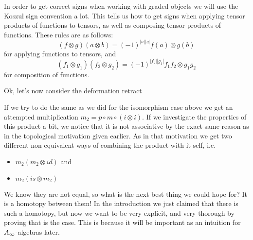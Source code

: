In order to get correct signs when working with graded objects we will use the Koszul sign convention a lot. This tells us how to get signs when applying tensor products of functions to tensors, as well as composing tensor products of functions. These rules are as follows: 
\begin{equation*}
    (f\otimes g)(a\otimes b) = (-1)^{|a||g|}f(a)\otimes g(b)
\end{equation*} 
for applying functions to tensors, and
\begin{equation*}
    (f_1\otimes g_1)(f_2\otimes g_2) = (-1)^{|f_2||g_1|}f_1 f_2 \otimes g_1 g_2
\end{equation*}
for composition of functions. 

Ok, let's now consider the deformation retract
\begin{center}
\end{center}

If we try to do the same as we did for the isomorphism case above we get an attempted multiplication $m_2 = p\circ m \circ (i\otimes i)$. If we investigate the properties of this product a bit, we notice that it is not associative by the exact same reason as in the topological motivation given earlier. As in that motivation we get two different non-equivalent ways of combining the product with it self, i.e. 
\begin{itemize}
    \item $m_2(m_2\otimes id)$ and 
    \item $m_2(is\otimes m_2)$
\end{itemize}
We know they are not equal, so what is the next best thing we could hope for? It is a homotopy between them! In the introduction we just claimed that there is such a homotopy, but now we want to be very explicit, and very thorough by proving that is the case. This is because it will be important as an intuition for $A_{\infty}$-algebras later. 


